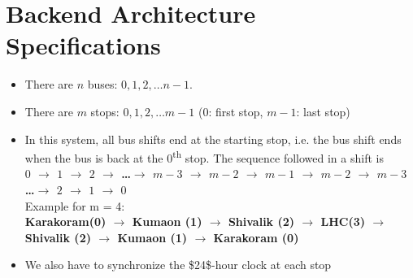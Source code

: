 \section{Backend Architecture Specifications}

\begin{itemize}
    \item There are $n$ buses: $0, 1, 2, \ldots n-1$.
    \item There are $m$ stops: $0, 1, 2, \ldots m-1$  ($0$: first stop, $m-1$: last stop)
    \item In this system, all bus shifts end at the starting stop, i.e. the bus shift ends when the bus is back at the $0$\textsuperscript{th} stop. The sequence followed in a shift is \\
          {\bfseries $0$ $\to$ $1$ $\to$ $2$ $\to$ \ldots $\to$ $m-3$ $\to$ $m-2$ $\to$ $m-1$ $\to$ $m-2$ $\to$ $m-3$ \ldots$\to$ $2$ $\to$ $1$ $\to$ $0$}\\
          Example for m = 4: \\
          {\bfseries Karakoram(0) $\to$ Kumaon (1) $\to$ Shivalik (2) $\to$ \ac{LHC}(3) $\to$ Shivalik (2) $\to$ Kumaon (1) $\to$ Karakoram (0)}
    \item We also have to synchronize the \gls{$24$-hour clock} at each stop
\end{itemize}


